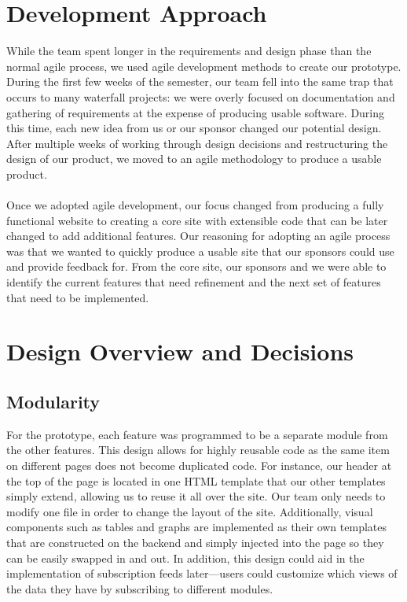 \documentclass[12pt]{article}
\begin{document}
\begin{spacing}{1.5}
\section{Development Approach}
 While the team spent longer in the requirements and design phase than the normal agile process, we used agile development methods to create our prototype. During the first few weeks of the semester, our team fell into the same trap that occurs to many waterfall projects: we were overly focused on documentation and gathering of requirements at the expense of producing usable software. During this time, each new idea from us or our sponsor changed our potential design. After multiple weeks of working through design decisions and restructuring the design of our product, we moved to an agile methodology to produce a usable product. 
\\ \\
Once we adopted agile development, our focus changed from producing a fully functional website to creating a core site with extensible code that can be later changed to add additional features. Our reasoning for adopting an agile process was that we wanted to quickly produce a usable site that our sponsors could use and provide feedback for. From the core site, our sponsors and we were able to identify the current features that need refinement and the next set of features that need to be implemented. 


\section{Design Overview and Decisions}
\subsection{Modularity}
For the prototype, each feature was programmed to be a separate module from the other features. This design allows for highly reusable code as the same item on different pages does not become duplicated code. For instance, our header at the top of the page is located in one HTML template that our other templates simply extend, allowing us to reuse it all over the site. Our team only needs to modify one file in order to change the layout of the site. Additionally, visual components such as tables and graphs are implemented as their own templates that are constructed on the backend and simply injected into the page so they can be easily swapped in and out. In addition, this design could aid in the implementation of subscription feeds later---users could customize which views of the data they have by subscribing to different modules.


\end{spacing}
\end{document}
